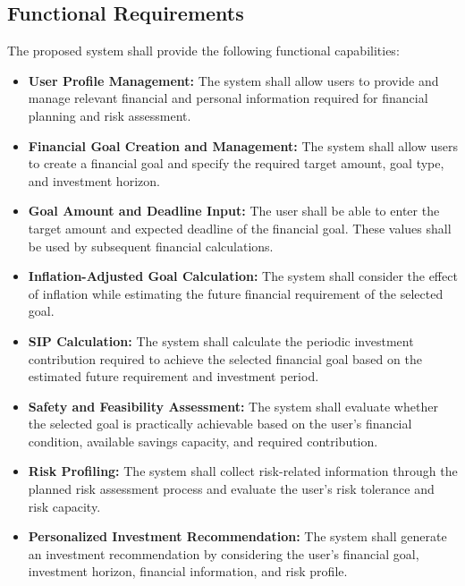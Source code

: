 \subsection{Functional Requirements}

The proposed system shall provide the following functional
capabilities:

\begin{itemize}

    \item \textbf{User Profile Management:}
    The system shall allow users to provide and manage relevant
    financial and personal information required for financial
    planning and risk assessment.

    \item \textbf{Financial Goal Creation and Management:}
    The system shall allow users to create a financial goal and
    specify the required target amount, goal type, and investment
    horizon.

    \item \textbf{Goal Amount and Deadline Input:}
    The user shall be able to enter the target amount and expected
    deadline of the financial goal. These values shall be used by
    subsequent financial calculations.

    \item \textbf{Inflation-Adjusted Goal Calculation:}
    The system shall consider the effect of inflation while estimating
    the future financial requirement of the selected goal.

    \item \textbf{SIP Calculation:}
    The system shall calculate the periodic investment contribution
    required to achieve the selected financial goal based on the
    estimated future requirement and investment period.

    \item \textbf{Safety and Feasibility Assessment:}
    The system shall evaluate whether the selected goal is practically
    achievable based on the user's financial condition, available
    savings capacity, and required contribution.

    \item \textbf{Risk Profiling:}
    The system shall collect risk-related information through the
    planned risk assessment process and evaluate the user's risk
    tolerance and risk capacity.

    \item \textbf{Personalized Investment Recommendation:}
    The system shall generate an investment recommendation by
    considering the user's financial goal, investment horizon,
    financial information, and risk profile.


\end{itemize}
